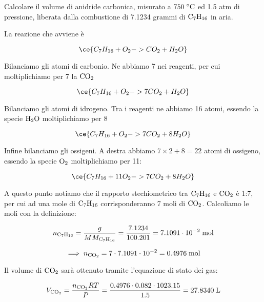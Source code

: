 \begin{esercizio}
    Calcolare il volume di anidride carbonica, misurato a $750 \; ^{\circ}\rm C$ ed 1.5 atm di pressione, liberata dalla combustione di 7.1234 grammi di $\rm C_7H_{16}$ in aria.
\end{esercizio}
\begin{soluzione}
    La reazione che avviene è

$$\ce{C_7H_{16} + O_2 -> CO_2 + H_2O}$$

Bilanciamo gli atomi di carbonio. Ne abbiamo 7 nei reagenti, per cui moltiplichiamo per 7 la $\rm CO_2$

$$\ce{C_7H_{16} + O_2 -> 7CO_2 + H_2O}$$

Bilanciamo gli atomi di idrogeno. Tra i reagenti ne abbiamo 16 atomi, essendo la specie $\rm H_2O$ moltiplichiamo per 8

$$\ce{C_7H_{16} + O_2 -> 7CO_2 + 8H_2O}$$

Infine bilanciamo gli ossigeni. A destra abbiamo $7 \times 2 + 8=22$ atomi di ossigeno, essendo la specie $\rm O_2$ moltiplichiamo per 11:

$$\ce{C_7H_{16} + 11O_2 -> 7CO_2 + 8H_2O}$$

A questo punto notiamo che il rapporto stechiometrico tra $\rm C_7H_{16}$ e $\rm CO_2$ è 1:7, per cui ad una mole di $\rm C_7H_{16}$ corrisponderanno 7 moli di $\rm CO_2$. Calcoliamo le moli con la definizione:

$$n_{\text{C}_7\text{H}_{16}}=\frac{g}{MM_{\text{C}_7\text{H}_{16}}}
=\frac{7.1234}{100.201}=7.1091 \cdot 10^{-2} \; \rm mol$$

$$\implies
n_{\rm CO_2}
=7 \cdot 7.1091 \cdot 10^{-2}=0.4976 \; \rm mol$$

Il volume di $\rm CO_2$ sarà ottenuto tramite l'equazione di stato dei gas:

$$V_{\rm CO_2}=\frac{n_{\rm CO_2}RT}{P}
=\frac{0.4976 \cdot 0.082 \cdot 1023.15}{1.5}=27.8340 \; \rm L$$
\end{soluzione}

\newpage

